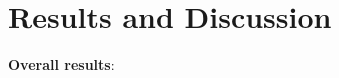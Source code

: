 \documentclass{article}
\begin{document}
\section{Results and Discussion}
\noindent\textbf{Overall results}: 
\end{document}

